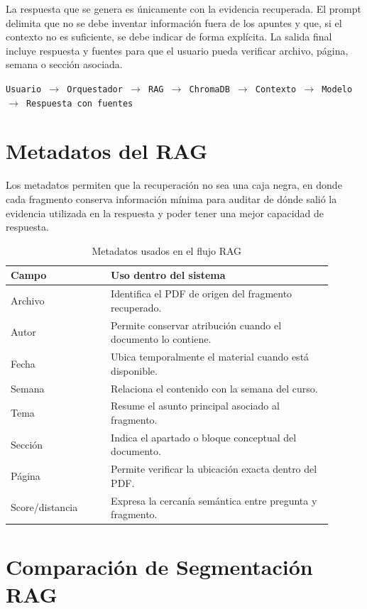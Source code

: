 \documentclass[conference]{IEEEtran}
\begin{document}
La respuesta que se genera es únicamente con la evidencia recuperada. El prompt delimita que no se debe inventar información fuera de los apuntes y que, si el contexto no es suficiente, se debe indicar de forma explícita. La salida final incluye respuesta y fuentes para que el usuario pueda verificar archivo, página, semana o sección asociada.

\begin{center}
\texttt{Usuario $\rightarrow$ Orquestador $\rightarrow$ RAG $\rightarrow$ ChromaDB $\rightarrow$ Contexto $\rightarrow$ Modelo $\rightarrow$ Respuesta con fuentes}
\end{center}

\section{Metadatos del RAG}

Los metadatos permiten que la recuperación no sea una caja negra, en donde cada fragmento conserva información mínima para auditar de dónde salió la evidencia utilizada en la respuesta y poder tener una mejor capacidad de respuesta.

\begin{table}[!t]
\caption{Metadatos usados en el flujo RAG}
\label{tab:metadata-rag}
\centering
\begin{tabular}{p{0.28\linewidth} p{0.62\linewidth}}
\hline
\textbf{Campo} & \textbf{Uso dentro del sistema} \\
\hline
Archivo & Identifica el PDF de origen del fragmento recuperado. \\
Autor & Permite conservar atribución cuando el documento lo contiene. \\
Fecha & Ubica temporalmente el material cuando está disponible. \\
Semana & Relaciona el contenido con la semana del curso. \\
Tema & Resume el asunto principal asociado al fragmento. \\
Sección & Indica el apartado o bloque conceptual del documento. \\
Página & Permite verificar la ubicación exacta dentro del PDF. \\
Score/distancia & Expresa la cercanía semántica entre pregunta y fragmento. \\
\hline
\end{tabular}
\end{table}

\section{Comparación de Segmentación RAG}
\end{document}
